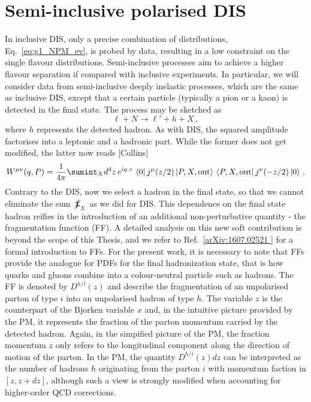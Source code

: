 \section{Semi-inclusive polarised DIS}
In inclusive DIS, only a precise combination of distributions, Eq.~\eqref{eq:g1_NPM_ev}, is probed by data, resulting in a low constraint on the single flavour distributions. Semi-inclusive processes aim to achieve a higher flavour separation if compared with inclusive experiments. In particular, we will consider data from semi-inclusive deeply inelastic processes, which are the same as inclusive DIS, except that a certain particle (typically a pion or a kaon) is detected in the final state. The process may be sketched as
\begin{equation}
  \ell + N \longrightarrow \ell' + h +  X \,,
    \label{eq:SIDIS}
\end{equation}
where $h$ represents the detected hadron. As with DIS, the squared amplitude factorises into a leptonic and a hadronic part. While the former does not get modified, the latter now reads [Collins]
\begin{equation}
  W^{\mu \nu} (q,P) = \frac{1}{4\pi} \sumint_{X} d^4 z \, e^{i q \cdot z} \, \bra{0} j^{\mu}(z/2) \ket{P,X,\T{out}} \, \bra{P,X,\T{out}} j^{\nu}(-z/2) \ket{0}\,.
\end{equation}
Contrary to the DIS, now we select a hadron in the final state, so that we cannot eliminate the sum $\sumint_{X}$ as we did for DIS. This dependence on the final state hadron reifies in the introduction of an additional non-perturbative quantity - the fragmentation function (FF). A detailed analysis on this new soft contribution is beyond the scope of this Thesis, and we refer to Ref.~[\href{https://arxiv.org/abs/1607.02521v2}{arXiv:1607.02521 }] for a formal introduction to FFs. For the present work, it is necessary to note that FFs provide the analogue for PDFs for the final hadronization state, that is how quarks and gluons combine into a colour-neutral particle such as hadrons. The FF is denoted by $D^{h/i}(z)$ and describe the fragmentation of an unpolarised parton of type $i$ into an unpolarised hadron of type $h$. The variable $z$ is the counterpart of the Bjorken variable $x$ and, in the intuitive picture provided by the PM, it represents the fraction of the parton momentum carried by the detected hadron. Again, in the simpified picture of the PM, the fraction momentum $z$ only refers to the longitudinal component along the direction of motion of the parton. In the PM, the quantity $D^{h/i}(z)dz$ can be interpreted as the number of hadrons $h$ originating from the parton $i$ with momentum faction in $[z, z+dz]$, although such a view is strongly modified when accounting for higher-order QCD corrections.\par
